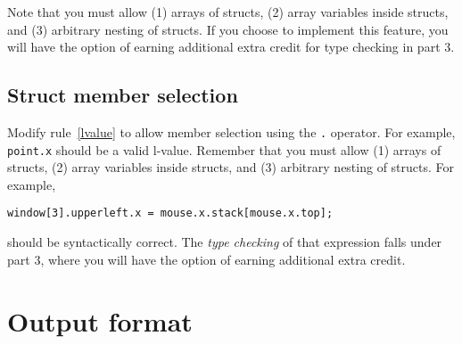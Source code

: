 \documentclass{article}
\newcommand{\typecheck}{3}
\begin{document}
Note that you must allow (1) arrays of structs, (2) array variables
inside structs, and (3) arbitrary nesting of structs.
%
If you choose to implement this feature,
you will have the option of earning
additional extra credit for type checking
in part \typecheck.

\subsection{Struct member selection}
\label{SEC:lastextra}
\label{SEC:members}

Modify rule~\ref{lvalue} to allow member selection using the
{\tt .} operator.
For example,
\lstinline{point.x}
should be a valid l-value.
Remember that you must allow (1) arrays of structs,
(2) array variables inside structs, and (3) arbitrary nesting of structs.
For example,
\begin{lstlisting}[numbers=none]
  window[3].upperleft.x = mouse.x.stack[mouse.x.top];
\end{lstlisting}
should be syntactically correct.
The \emph{type checking} of that expression falls under part \typecheck,
where you will have the option of earning additional extra credit.


\section{Output format}
\label{SEC:output}
\end{document}

